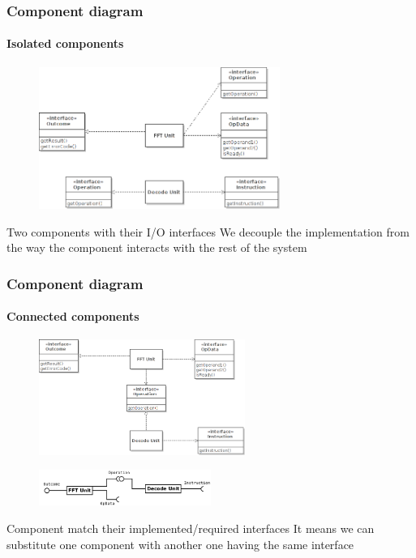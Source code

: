 \begin{frame}
\frametitle{Component diagram}
\framesubtitle{Isolated components}

\begin{figure}
\includegraphics[width=0.7\textwidth]{lecture02/img/isolated_components.png}
\end{figure}

\begin{block}{Two components with their I/O interfaces}
We decouple the implementation from the way the component interacts with the rest of the system
\end{block}
\end{frame}

\begin{frame}
\frametitle{Component diagram}
\framesubtitle{Connected components}

\begin{figure}
\includegraphics[width=0.6\textwidth]{lecture02/img/connected_components.png}
\end{figure}
\begin{figure}
\includegraphics[width=0.5\textwidth]{lecture02/img/ballsocket_connected_components.png}
\end{figure}


\begin{block}{Component match their implemented/required interfaces}
It means we can substitute one component with another one having the same interface
\end{block}
\end{frame}

